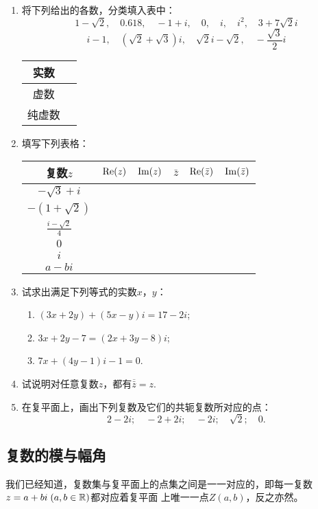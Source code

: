 \begin{ex}
\begin{enumerate}
    \item 将下列给出的各数，分类填入表中：
\[1-\sqrt{2},\quad 0.618,\quad -1+i,\quad 0,\quad i,\quad i^2,\quad 3+7\sqrt{2}i\]
\[i-1,\quad (\sqrt{2}+\sqrt{3})i,\quad \sqrt{2}i-\sqrt{2},\quad -\frac{\sqrt{3}}{2}i\]
\begin{tabular}{|c|p{}|}
\hline
    实数&\\
\hline
虚数&\\\hline
纯虚数&\\    \hline
\end{tabular}

\item 填写下列表格：
\begin{center}
\begin{tabular}{|c|p{}|p{}|p{}|p{}|p{}|}
\hline 
复数$z$& ${\rm Re}(z)$& ${\rm Im}(z)$&$\bar z$& ${\rm Re}(\bar z)$& ${\rm Im}(\bar z)$\\
\hline
$-\sqrt{3}+i$ &&&&&\\
$-(1+\sqrt{2})$&&&&&\\
$\frac{i-\sqrt{2}}{4}$&&&&&\\
$0$&&&&&\\
$i$&&&&&\\
$a-bi$&&&&&\\
\hline
\end{tabular}
\end{center}
\item 试求出满足下列等式的实数$x$，$y$：
\begin{enumerate}[(1)]
\item $(3x+2y)+(5x-y)i=17-2i$;
\item $3x+2y-7=(2x+3y-8)i$;
\item $7x+(4y-1)i-1=0$.
\end{enumerate}

\item 试说明对任意复数$z$，都有$\overline{\bar z}=z$.
\item 在复平面上，画出下列复数及它们的共轭复数所对应的点：
\[2-2i;\quad -2+2i;\quad -2i; \quad \sqrt{2};\quad 0.\]
\end{enumerate}
\end{ex}

\subsection{复数的模与幅角}
我们已经知道，复数集与复平面上的点集之间是一一对应的，即每一复数$z=a+bi\; (a,b\in\mathbb{R})$都对应着复平面
上唯一一点$Z(a,b)$，反之亦然。

